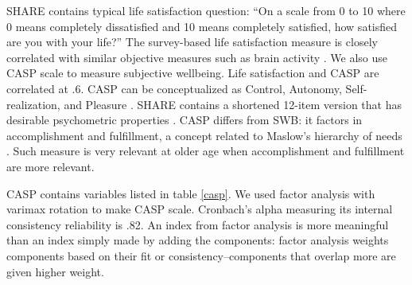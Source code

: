 \documentclass[10pt, letterpaper]{article}
\begin{document}
\begin{spacing}{1.4}
SHARE contains typical life satisfaction question: %
``On a scale from 0 to 10 where 0 means completely dissatisfied and 10 means
completely satisfied, how satisfied
are you with your life?'' The survey-based life
 satisfaction measure is closely correlated with similar objective
 measures such as brain activity \citep{layard05}.
 We also use CASP scale to measure subjective
wellbeing. Life satisfaction and CASP are correlated at .6. CASP can be conceptualized as Control, Autonomy,
Self-realization, and Pleasure \citep{hyde03,hyde15}. SHARE contains a shortened 12-item version that has
desirable psychometric properties \citep{knesbeck2005quality}. CASP differs from
SWB: it factors in accomplishment and fulfillment, a concept related to Maslow's
hierarchy of needs \citep{maslow87}. Such measure is  very relevant at older age
when accomplishment and fulfillment are more relevant. %

CASP contains  variables listed in table \ref{casp}. We used factor
analysis with varimax rotation to make CASP scale. Cronbach's alpha measuring its internal
consistency reliability is .82.  An index from factor analysis is more
meaningful than an index simply made by adding the components: factor analysis
weights components based on their fit or consistency--components that overlap
more are given higher weight.


\end{spacing}
\end{document}

